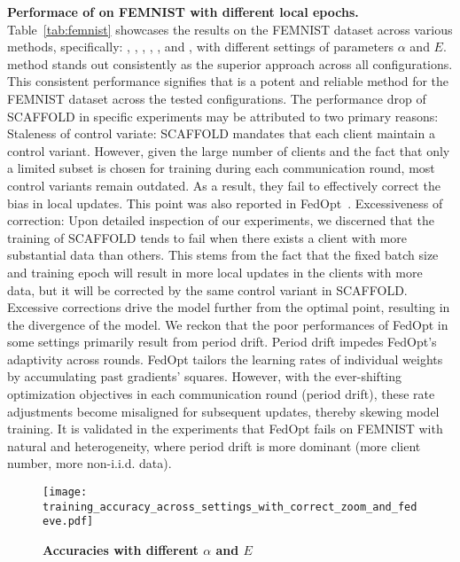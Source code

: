 \textbf{Performace of \fedeve on FEMNIST with different local epochs.}\label{sec:different local epochs}
Table~\ref{tab:femnist} showcases the results on the FEMNIST dataset across various methods, specifically: \fedavg, \fedavgm, \fedprox, \scaffold, \fedopt, and \fedeve, with different settings of parameters $\alpha$ and $E$. \fedeve method stands out consistently as the superior approach across all configurations. This consistent performance signifies that \fedeve is a potent and reliable method for the FEMNIST dataset across the tested configurations.
The performance drop of SCAFFOLD in specific experiments may be attributed to two primary reasons:
Staleness of control variate: SCAFFOLD mandates that each client maintain a control variant. However, given the large number of clients and the fact that only a limited subset is chosen for training during each communication round, most control variants remain outdated. As a result, they fail to effectively correct the bias in local updates. This point was also reported in FedOpt~\citep{reddi2020adaptive}.
Excessiveness of correction: Upon detailed inspection of our experiments, we discerned that the training of SCAFFOLD tends to fail when there exists a client with more substantial data than others. This stems from the fact that the fixed batch size and training epoch will result in more local updates in the clients with more data, but it will be corrected by the same control variant in SCAFFOLD. Excessive corrections drive the model further from the optimal point, resulting in the divergence of the model.
We reckon that the poor performances of FedOpt in some settings primarily result from period drift. Period drift impedes FedOpt's adaptivity across rounds. FedOpt tailors the learning rates of individual weights by accumulating past gradients' squares.
However, with the ever-shifting optimization objectives in each communication round (period drift), these rate adjustments become misaligned for subsequent updates, thereby skewing model training.
It is validated in the experiments that FedOpt fails on FEMNIST with natural and 
 heterogeneity, where period drift is more dominant (more client number, more non-i.i.d. data).

 \begin{figure}[t]
  \centering
 \texttt{[image: training\_accuracy\_across\_settings\_with\_correct\_zoom\_and\_fedeve.pdf]}\label{fig:diff}
  \caption{\small \textbf{Accuracies with different $\alpha$ and $E$}}
\end{figure}

